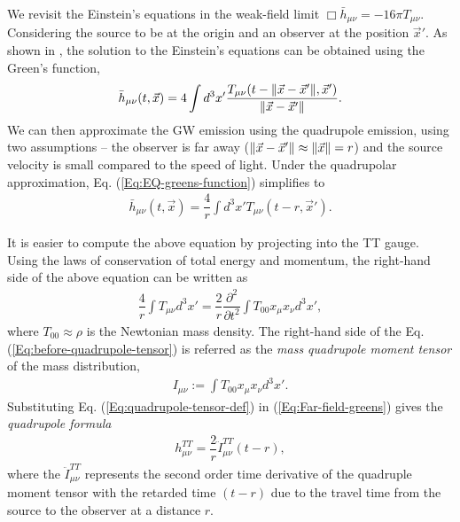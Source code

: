 We revisit the Einstein's equations in the weak-field limit $\Box \bar{h}_{\mu\nu} = -16\pi T_{\mu\nu}$. Considering the source to be at the origin and an observer at the position $\vec{x}'$. As shown in \cite{Maggiore:2008aaa}, the solution to the Einstein's equations can be obtained using the Green's function,
\begin{align}
    \bar{h}_{\mu\nu}(t, \vec{x}) = 4 \int d^3x' \dfrac{T_{\mu\nu}(t-\norm{\vec{x}-\vec{x}'},\vec{x}')}{\norm{\vec{x}-\vec{x}'}}.
    \label{Eq:EQ-greens-function}
\end{align}
We can then approximate the GW emission using the quadrupole emission, using two assumptions -- the observer is far away ($\norm{\vec{x}-\vec{x}'} \approx \norm{\vec{x}} = r$) and the source velocity is small compared to the speed of light.  Under the quadrupolar approximation, Eq. (\ref{Eq:EQ-greens-function}) simplifies to
\begin{align}
    \bar{h}_{\mu\nu}(t, \vec{x}) = \dfrac{4}{r} \int d^3x' T_{\mu\nu}(t-r,\vec{x}').
    \label{Eq:Far-field-greens}
\end{align}

It is easier to compute the above equation by projecting into the TT gauge. Using the laws of conservation of total energy and momentum, the right-hand side of the above equation can be written as 
\begin{align}
    \dfrac{4}{r} \int T_{\mu\nu} d^3x' = \dfrac{2}{r} \dfrac{\partial^2}{\partial t^2} \int T_{00} x_{\mu}x_{\nu} d^3x',
    \label{Eq:before-quadrupole-tensor}
\end{align}
where $T_{00} \approx \rho$ is the Newtonian mass density. The right-hand side of the Eq. (\ref{Eq:before-quadrupole-tensor}) is referred as the \textit{mass quadrupole moment tensor} of the mass distribution,
\begin{align}
    I_{\mu\nu} := \int T_{00}x_{\mu}x_{\nu}d^3x'.
    \label{Eq:quadrupole-tensor-def}
\end{align}
Substituting Eq. (\ref{Eq:quadrupole-tensor-def}) in (\ref{Eq:Far-field-greens}) gives the \textit{quadrupole formula}
\begin{align}
    h_{\mu\nu}^{TT} = \dfrac{2}{r}\ddot{I}_{\mu\nu}^{TT}(t-r),
    \label{Eq:second-order-metric-perturb}
\end{align}
where the $\ddot{I}_{\mu\nu}^{TT}$ represents the second order time derivative of the quadruple moment tensor with the retarded time $(t-r)$ due to the travel time from the source to the observer at a distance $r$. 

